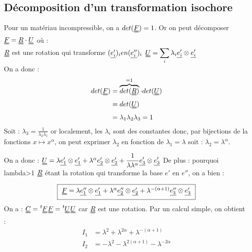 \documentclass[a4paper,11pt]{article}
\newcommand{\trans}[1]{\tensor[^t]{#1}{}}
\newcommand{\SUM}{\displaystyle\sum}
\newcommand{\FRAC}{\displaystyle\frac}
\newcommand{\tens}{\uuline}
\begin{document}
\subsection{Décomposition d'un transformation isochore}
Pour un matériau incompressible, on a $det(\tens{F}) = 1$.
Or on peut décomposer $\tens{F} = \tens{R}\cdot \tens{U}$ où :\\
$\tens{R}$ est une rotation qui transforme $(\uline{e'_i})_i en (\uline{e''_i})_i$
$\tens{U} = \SUM_i \lambda_i \uline{e'_i} \otimes \uline{e'_i}$
\\
On a donc :
\begin{align*}
det(\tens{F}) &= \overbrace{det(\tens{R})}^{=1} \cdot det(\tens{U}) \\
&= det(\tens{U}) \\
&= \lambda_1 \lambda_2 \lambda_3 = 1\\
\end{align*}
Soit : $\lambda_3 = \FRAC{1}{\lambda_2 \lambda_1}$ or localement, les $\lambda_i$ sont des constantes donc, par bijections de la fonctions $x \mapsto x^\alpha$, on peut exprimer $\lambda_2$ en fonction de $\lambda_1 = \lambda$ soit : $\lambda_2 = \lambda^\alpha$.

On a donc : $\tens{U} = \lambda \uline{e'_1} \otimes \uline{e'_1} + \lambda^\alpha \uline{e'_2} \otimes \uline{e'_2} + \FRAC{1}{\lambda \lambda^\alpha} \uline{e'_3} \otimes \uline{e'_3}$
De plus : pourquoi lambda>1
$\tens{R}$ étant la rotation qui transforme la base $e'$ en $e''$, on a bien :
\begin{equation}
\fbox{
$
\tens{F} = \lambda \uline{e''_1} \otimes \uline{e'_1} + \lambda^\alpha \uline{e''_2} \otimes \uline{e'_2} + \lambda^{-(\alpha +1)} \uline{e''_3} \otimes \uline{e'_3}
$
}
\end{equation}
On a : $\tens{C} = \trans{\tens{F}} \tens{F} = \trans{\tens{U}} \tens{U}$ car $\tens{R}$ est une rotation.
Par un calcul simple, on obtient :
\begin{align*}
I_1 &= \lambda^2 + \lambda^{2 \alpha} + \lambda^{-(\alpha +1)} \\
I_2 &= -\lambda^2 - \lambda^{2 (\alpha+1)} - \lambda^{ -2 \alpha} \\
\end{align*}

\end{document}
